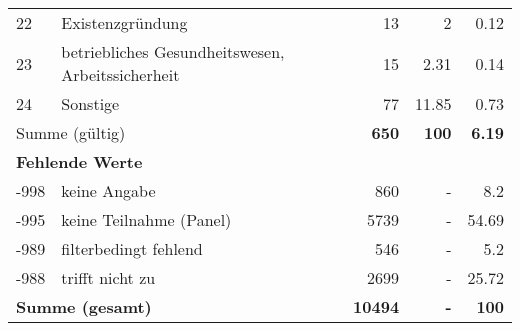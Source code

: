 \begin{longtable}{lXrrr}
        22 & \multicolumn{1}{X}{Existenzgründung} & %
          \num{13} &
          \num[round-mode=places,round-precision=2]{2} &
          \num[round-mode=places,round-precision=2]{0,12} \\

        23 & \multicolumn{1}{X}{betriebliches Gesundheitswesen, Arbeitssicherheit} & %
          \num{15} &
          \num[round-mode=places,round-precision=2]{2,31} &
          \num[round-mode=places,round-precision=2]{0,14} \\

        24 & \multicolumn{1}{X}{Sonstige} & %
          \num{77} &
          \num[round-mode=places,round-precision=2]{11,85} &
          \num[round-mode=places,round-precision=2]{0,73} \\

     \midrule
     \multicolumn{2}{l}{Summe (gültig)} &
       \textbf{\num{650}} &
     \textbf{100} &
       \textbf{\num[round-mode=places,round-precision=2]{6,19}} \\
     \multicolumn{5}{l}{\textbf{Fehlende Werte}}\\
       -998 &
       keine Angabe &
         \num{860} &
        - &
         \num[round-mode=places,round-precision=2]{8,2} \\
       -995 &
       keine Teilnahme (Panel) &
         \num{5739} &
        - &
         \num[round-mode=places,round-precision=2]{54,69} \\
       -989 &
       filterbedingt fehlend &
         \num{546} &
        - &
         \num[round-mode=places,round-precision=2]{5,2} \\
       -988 &
       trifft nicht zu &
         \num{2699} &
        - &
         \num[round-mode=places,round-precision=2]{25,72} \\
     \midrule
     \multicolumn{2}{l}{\textbf{Summe (gesamt)}} &
          \textbf{\num{10494}} &
        \textbf{-} &
        \textbf{100} \\
     \bottomrule
     \end{longtable}
     
